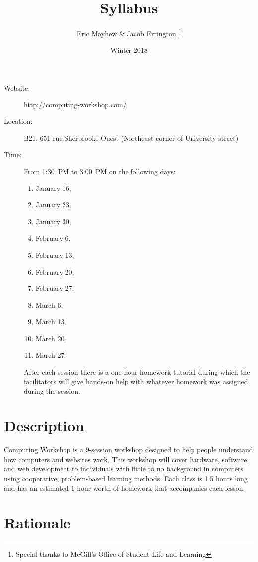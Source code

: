 \documentclass[11pt]{article}
\author{%
  Eric Mayhew \& Jacob Errington%
  \footnote{Special thanks to McGill's Office of Student Life and Learning}
}
\title{Syllabus}
\date{Winter 2018}
\begin{document}
\maketitle

\begin{description}
  \item[Website:]
    \url{http://computing-workshop.com/}

  \item[Location:]
    B21, 651 rue Sherbrooke Ouest
    (Northeast corner of University street)

  \item[Time:]
    From 1:30~PM to 3:00~PM on the following days:
    \begin{enumerate}
      \item January 16,
      \item January 23,
      \item January 30,
      \item February 6,
      \item February 13,
      \item February 20,
      \item February 27,
      \item March 6,
      \item March 13,
      \item March 20,
      \item March 27.
    \end{enumerate}

    After each session there is a one-hour homework tutorial during which the
    facilitators will give hands-on help with whatever homework was assigned
    during the session.
\end{description}

\section*{Description}

Computing Workshop is a 9-session workshop designed to help people understand
how computers and websites work. This workshop will cover hardware, software,
and web development to individuals with little to no background in computers
using cooperative, problem-based learning methods. Each class is 1.5 hours long
and has an estimated 1 hour worth of homework that accompanies each lesson.

\section*{Rationale}
\end{document}
